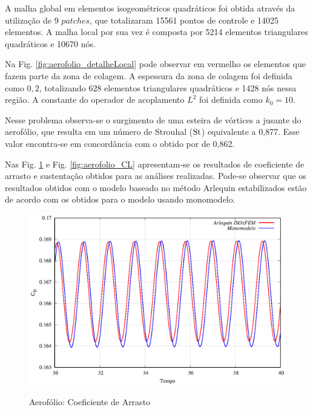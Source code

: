 \documentclass[tese_patricia]{subfiles}
\begin{document}
A malha global em elementos isogeométricos quadráticos foi obtida através da utilização de 9 $patches$, que totalizaram 15561 pontos de controle e 14025 elementos. A malha local por sua vez é composta por 5214 elementos triangulares quadráticos e 10670 nós. 

Na Fig. \ref{fig:aerofolio_detalheLocal} pode observar em vermelho os elementos que fazem parte da zona de colagem. A espessura da zona de colagem foi definida como $0,2$, totalizando 628 elementos triangulares quadráticos e 1428 nós nessa região. A constante do operador de acoplamento $L^{2}$ foi definida como $k_{0} = 10$. 


Nesse problema observa-se o surgimento de uma esteira de vórtices a jusante do aerofólio, que resulta em um número de Strouhal ($\mathrm{St}$) equivalente a 0,877. Esse valor encontra-se em concordância com o obtido por  de 0,862. 

Nas Fig. \ref{fig:aerofolio_CD} e Fig. \ref{fig:aerofolio_CL} apresentam-se os resultados de coeficiente de arrasto e sustentação obtidos para as análises realizadas. Pode-se observar que os resultados obtidos com o modelo baseado no método Arlequin estabilizados estão de acordo com os obtidos para o modelo usando monomodelo.


\begin{figure}[htb!]
	\centering 
	{\includegraphics[scale=1.0,trim=0cm 0cm 0cm 0cm, clip=true]{Imagens/Cap6/aerofolio_CD.eps}}	
	\caption{Aerofólio: Coeficiente de Arrasto}
	\label{fig:aerofolio_CD}
\end{figure}
\end{document}
